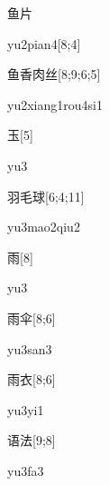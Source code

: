 \begin{verbete}[yu2pian4]{鱼片}
\begin{pronuncia}{yu2pian4}[8;4]
\end{pronuncia}
\end{verbete}

\begin{verbete}{鱼香肉丝}[8;9;6;5]
\begin{pronuncia}{yu2xiang1rou4si1}
\end{pronuncia}
\end{verbete}

\begin{verbete}[yu3]{玉}[5]
\begin{pronuncia}{yu3}
\end{pronuncia}
\end{verbete}

\begin{verbete}{羽毛球}[6;4;11]
\begin{pronuncia}{yu3mao2qiu2}
\end{pronuncia}
\end{verbete}

\begin{verbete}[yu3]{雨}[8]
\begin{pronuncia}{yu3}
\end{pronuncia}
\end{verbete}

\begin{verbete}[yu3san3]{雨伞}[8;6]
\begin{pronuncia}{yu3san3}
\end{pronuncia}
\end{verbete}

\begin{verbete}[yu3yi1]{雨衣}[8;6]
\begin{pronuncia}{yu3yi1}
\end{pronuncia}
\end{verbete}

\begin{verbete}[yu3fa3]{语法}[9;8]
\begin{pronuncia}{yu3fa3}
\end{pronuncia}
\end{verbete}

